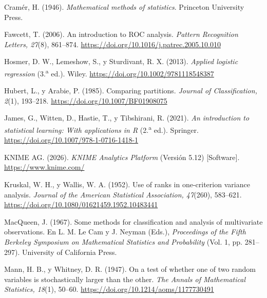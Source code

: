 \documentclass[a4paper,stu,12pt,donotrepeattitle,floatsintext]{apa7}
\begin{document}
{\hangindent=0.5in\noindent Cramér, H. (1946). \emph{Mathematical methods of statistics}. Princeton University Press.\par}

{\hangindent=0.5in\noindent Fawcett, T. (2006). An introduction to ROC analysis. \emph{Pattern Recognition Letters, 27}(8), 861--874. \url{https://doi.org/10.1016/j.patrec.2005.10.010}\par}

{\hangindent=0.5in\noindent Hosmer, D. W., Lemeshow, S., y Sturdivant, R. X. (2013). \emph{Applied logistic regression} (3.\textsuperscript{a} ed.). Wiley. \url{https://doi.org/10.1002/9781118548387}\par}

{\hangindent=0.5in\noindent Hubert, L., y Arabie, P. (1985). Comparing partitions. \emph{Journal of Classification, 2}(1), 193--218. \url{https://doi.org/10.1007/BF01908075}\par}

{\hangindent=0.5in\noindent James, G., Witten, D., Hastie, T., y Tibshirani, R. (2021). \emph{An introduction to statistical learning: With applications in R} (2.\textsuperscript{a} ed.). Springer. \url{https://doi.org/10.1007/978-1-0716-1418-1}\par}

{\hangindent=0.5in\noindent KNIME AG. (2026). \emph{KNIME Analytics Platform} (Versión 5.12) [Software]. \url{https://www.knime.com/}\par}

{\hangindent=0.5in\noindent Kruskal, W. H., y Wallis, W. A. (1952). Use of ranks in one-criterion variance analysis. \emph{Journal of the American Statistical Association, 47}(260), 583--621. \url{https://doi.org/10.1080/01621459.1952.10483441}\par}

{\hangindent=0.5in\noindent MacQueen, J. (1967). Some methods for classification and analysis of multivariate observations. En L. M. Le Cam y J. Neyman (Eds.), \emph{Proceedings of the Fifth Berkeley Symposium on Mathematical Statistics and Probability} (Vol. 1, pp. 281--297). University of California Press.\par}

{\hangindent=0.5in\noindent Mann, H. B., y Whitney, D. R. (1947). On a test of whether one of two random variables is stochastically larger than the other. \emph{The Annals of Mathematical Statistics, 18}(1), 50--60. \url{https://doi.org/10.1214/aoms/1177730491}\par}
\end{document}
